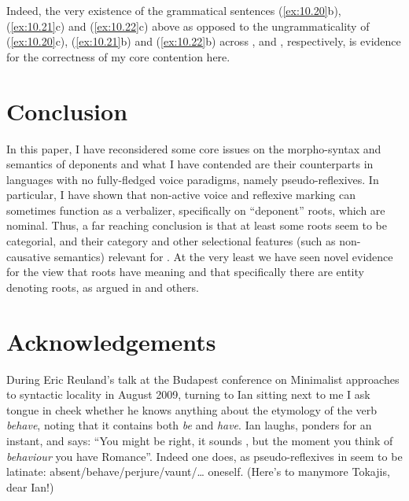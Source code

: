 \documentclass[output=paper]{langsci/langscibook}
\begin{document}
Indeed, the very existence of the grammatical sentences (\ref{ex:10.20}b),
(\ref{ex:10.21}c) and (\ref{ex:10.22}c) above as opposed to the
ungrammaticality of (\ref{ex:10.20}c), (\ref{ex:10.21}b) and
(\ref{ex:10.22}b) across ,  and , respectively, is
evidence for the correctness of my core contention here.

\section{Conclusion}\label{sec:10.5}

In this paper, I have reconsidered some core issues on the morpho-syntax and
semantics of deponents and what I have contended are their counterparts in
languages with no fully-fledged voice paradigms, namely pseudo-reflexives. In
particular, I have shown that non-active voice and reflexive marking can
sometimes function as a verbalizer, specifically on \enquote{deponent} roots,
which are nominal. Thus, a far reaching conclusion is that at least some roots
seem to be categorial, and their category and other selectional features (such
as non-causative semantics) relevant for . At the very least we have
seen novel evidence for the view that roots have meaning and that specifically
there are entity denoting roots, as argued in \citet{Harley2005,Levinson2007}
and others.

\printchapterglossary{}

\section*{Acknowledgements}

During Eric Reuland’s talk at the Budapest conference on Minimalist approaches
to syntactic locality in August 2009, turning to Ian sitting next to me I ask
tongue in cheek whether he knows anything about the etymology of the verb
\textit{behave}, noting that it contains both \textit{be} and \textit{have}.
Ian laughs, ponders for an instant, and says: “You might be right, it sounds ,
but the moment you think of \textit{behaviour} you have Romance”. Indeed one does, as
pseudo-reflexives in  seem to be latinate:
absent\slash behave\slash perjure\slash vaunt\slash\dots{} oneself.
(Here’s to many\linebreak more Tokajis, dear Ian!)

{\sloppy\printbibliography[heading=subbibliography,notkeyword=this]}
\end{document}
